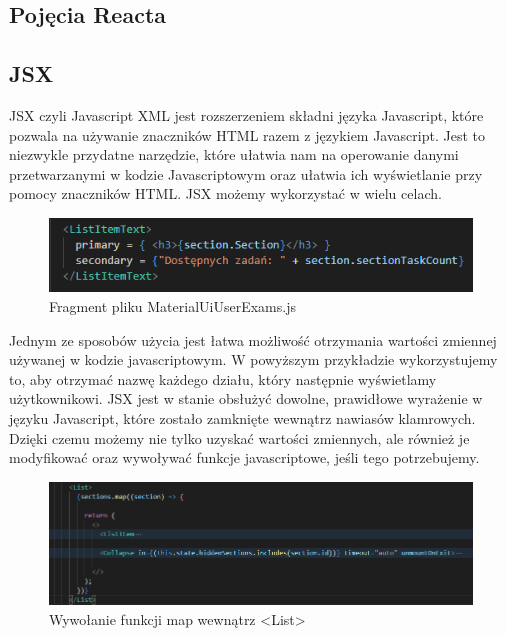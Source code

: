 \documentclass[oneside,polski,logo,indent]{amuthesis}
\begin{document}
\begin{enumerate}
\begin{enumerate}
\section{Pojęcia Reacta}




\subsection{JSX}

{
JSX czyli Javascript XML jest rozszerzeniem składni języka Javascript, które pozwala na używanie znaczników HTML razem z językiem Javascript. Jest to niezwykle przydatne narzędzie, które ułatwia nam na operowanie danymi przetwarzanymi w kodzie Javascriptowym oraz ułatwia ich wyświetlanie przy pomocy znaczników HTML. JSX możemy wykorzystać w wielu celach.

\begin{figure}[H]
\centering
\includegraphics[width=13cm]{JSX example h3.png}
\caption{Fragment pliku MaterialUiUserExams.js
}
\label{react dev example.jpg}
\end{figure}

Jednym ze sposobów użycia jest łatwa możliwość otrzymania wartości zmiennej używanej w kodzie javascriptowym. W powyższym przykładzie wykorzystujemy to, aby otrzymać nazwę każdego działu, który następnie wyświetlamy użytkownikowi.
JSX jest w stanie obsłużyć dowolne, prawidłowe wyrażenie w języku Javascript, które zostało zamknięte wewnątrz nawiasów klamrowych. Dzięki czemu możemy nie tylko uzyskać wartości zmiennych, ale również je modyfikować oraz wywoływać funkcje javascriptowe, jeśli tego potrzebujemy.



\begin{figure}[H]
\centering
\includegraphics[width=13cm]{JSX example map.png}
\caption{Wywołanie funkcji map wewnątrz <List>
}
\label{react dev example.jpg}
\end{figure}

}
\end{enumerate}
\end{enumerate}
\end{document}
